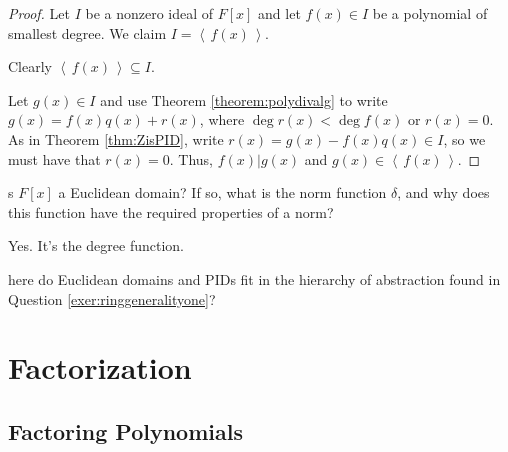 \documentclass[english,course]{lecture}
\newcommand{\ideal}[1]{\left\langle\, #1 \,\right\rangle}
\newenvironment{hint}{\startimportant}{}
\def\startimportant#1\end{[{Hint:} #1]\end}
\theoremstyle{plain}
\newenvironment{question}[1]
  {\renewcommand\theinnerquestion{#1}\innerquestion}
  {\endinnerquestion}
\def\presnotes{}
\begin{document}
\presnotes




\begin{proof}
	Let $I$ be a nonzero ideal of $F[x]$ and let $f(x)\in I$ be a polynomial of smallest degree.
	We claim $I = \ideal{f(x)}$.
	
	Clearly $\ideal{f(x)}\subseteq I$.
	
	Let $g(x)\in I$ and use Theorem \ref{theorem:polydivalg} to write $g(x) = f(x) q(x) + r(x)$, where $\deg r(x) < \deg f(x)$ or $r(x) = 0$.
	As in Theorem \ref{thm:ZisPID}, write $r(x) = g(x) - f(x) q(x) \in I$, so we must have that $r(x) = 0$.
	Thus, $f(x) | g(x)$ and $g(x)\in \ideal{f(x)}$.
\end{proof}

\presnotes

\begin{question}
	Is $F[x]$ a Euclidean domain? If so, what is the norm function $\delta$, and why does this function have the required properties of a norm?
\end{question}

\begin{answer}
	Yes. It's the degree function.
\end{answer}

\presnotes






\begin{question}
	Where do Euclidean domains and PIDs fit in the hierarchy of abstraction found in Question \ref{exer:ringgeneralityone}?
\end{question}

\presnotes


\newpage


\section{Factorization}\label{sec:factorization}


\subsection{Factoring Polynomials}
\end{document}
